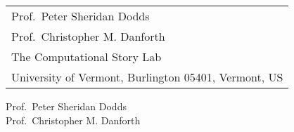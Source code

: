 \documentclass[11pt]{article}
\begin{document}
\sffamily 

{ \small
  \begin{tabular}[b]{l}
    Prof.\ Peter Sheridan Dodds\\
    Prof.\ Christopher M. Danforth\\
The Computational Story Lab\\
University of Vermont, Burlington 05401, Vermont, US
\end{tabular}
}


\bigskip
\bigskip






Prof.\ Peter Sheridan Dodds \\
Prof.\ Christopher M. Danforth



\end{document}
